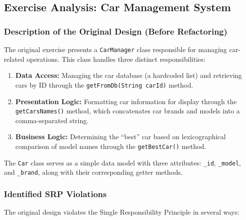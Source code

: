 \subsection{Exercise Analysis: Car Management System}

\subsubsection{Description of the Original Design (Before Refactoring)}

The original exercise presents a \texttt{CarManager} class responsible for managing car-related operations. This class handles three distinct responsibilities:

\begin{enumerate}
    \item \textbf{Data Access:} Managing the car database (a hardcoded list) and retrieving cars by ID through the \texttt{getFromDb(String carId)} method.
    
    \item \textbf{Presentation Logic:} Formatting car information for display through the \texttt{getCarsNames()} method, which concatenates car brands and models into a comma-separated string.
    
    \item \textbf{Business Logic:} Determining the ``best'' car based on lexicographical comparison of model names through the \texttt{getBestCar()} method.
\end{enumerate}

The \texttt{Car} class serves as a simple data model with three attributes: \texttt{\_id}, \texttt{\_model}, and \texttt{\_brand}, along with their corresponding getter methods.

\subsubsection{Identified SRP Violations}

The original design violates the Single Responsibility Principle in several ways:

